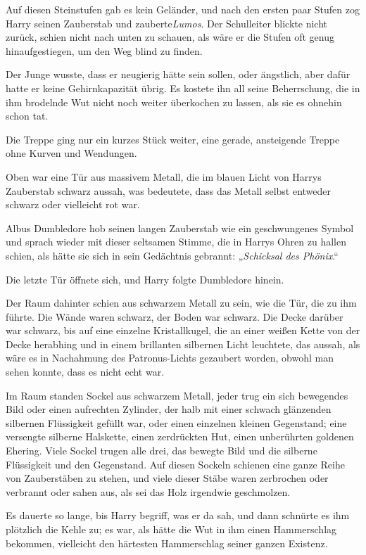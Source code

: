 {Auf diesen Steinstufen gab es kein Geländer, und nach den ersten paar Stufen zog Harry seinen Zauberstab und zauberte\emph{Lumos}. Der Schulleiter blickte nicht zurück, schien nicht nach unten zu schauen, als wäre er die Stufen oft genug hinaufgestiegen, um den Weg blind zu finden.

Der Junge wusste, dass er neugierig hätte sein sollen, oder ängstlich, aber dafür hatte er keine Gehirnkapazität übrig. Es kostete ihn all seine Beherrschung, die in ihm brodelnde Wut nicht noch weiter überkochen zu lassen, als sie es ohnehin schon tat.

Die Treppe ging nur ein kurzes Stück weiter, eine gerade, ansteigende Treppe ohne Kurven und Wendungen.

Oben war eine Tür aus massivem Metall, die im blauen Licht von Harrys Zauberstab schwarz aussah, was bedeutete, dass das Metall selbst entweder schwarz oder vielleicht rot war.

Albus Dumbledore hob seinen langen Zauberstab wie ein geschwungenes Symbol und sprach wieder mit dieser seltsamen Stimme, die in Harrys Ohren zu hallen schien, als hätte sie sich in sein Gedächtnis gebrannt: „\emph{Schicksal des Phönix}.“

Die letzte Tür öffnete sich, und Harry folgte Dumbledore hinein.

Der Raum dahinter schien aus schwarzem Metall zu sein, wie die Tür, die zu ihm führte. Die Wände waren schwarz, der Boden war schwarz. Die Decke darüber war schwarz, bis auf eine einzelne Kristallkugel, die an einer weißen Kette von der Decke herabhing und in einem brillanten silbernen Licht leuchtete, das aussah, als wäre es in Nachahmung des Patronus-Lichts gezaubert worden, obwohl man sehen konnte, dass es nicht echt war.

Im Raum standen Sockel aus schwarzem Metall, jeder trug ein sich bewegendes Bild oder einen aufrechten Zylinder, der halb mit einer schwach glänzenden silbernen Flüssigkeit gefüllt war, oder einen einzelnen kleinen Gegenstand; eine versengte silberne Halskette, einen zerdrückten Hut, einen unberührten goldenen Ehering. Viele Sockel trugen alle drei, das bewegte Bild und die silberne Flüssigkeit und den Gegenstand. Auf diesen Sockeln schienen eine ganze Reihe von Zauberstäben zu stehen, und viele dieser Stäbe waren zerbrochen oder verbrannt oder sahen aus, als sei das Holz irgendwie geschmolzen.

Es dauerte so lange, bis Harry begriff, was er da sah, und dann schnürte es ihm plötzlich die Kehle zu; es war, als hätte die Wut in ihm einen Hammerschlag bekommen, vielleicht den härtesten Hammerschlag seiner ganzen Existenz.

}
